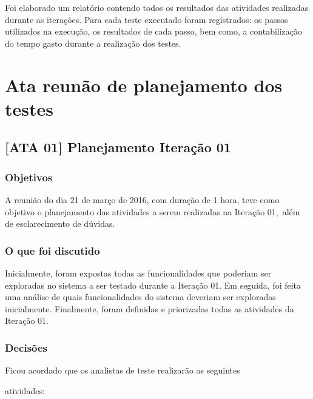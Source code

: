 \documentclass[
    12pt,               %
    openright,          %
    oneside,            %
    a4paper,            %
    section=TITLE,     %
    english,            %
    french,             %
    spanish,            %
    brazil              %
    ]{abntex2}
\begin{document}
Foi elaborado um relatório contendo todos os resultados das atividades realizadas durante as iterações. Para cada teste executado foram registrados: os passos utilizados na execução, os resultados de cada passo, bem como, a contabilização do tempo gasto durante a realização dos testes.



\section{Ata reunão de planejamento dos testes}


\subsection*{{[}ATA 01{]} Planejamento Iteração 01}


\subsubsection*{Objetivos}

A reunião do dia 21 de março de 2016, com duração de 1 hora, teve como objetivo o planejamento das atividades a serem realizadas na Iteração 01,~além de esclarecimento de dúvidas.



\subsubsection*{O que foi discutido}

Inicialmente, foram expostas todas as funcionalidades que poderiam ser exploradas no sistema a ser testado durante a Iteração 01. Em seguida, foi feita uma análise de quais funcionalidades do sistema deveriam ser exploradas inicialmente. Finalmente, foram definidas e priorizadas todas as atividades da Iteração 01.



\subsubsection*{Decisões}

Ficou acordado que os analistas de teste realizarão as seguintes


atividades:
\end{document}
